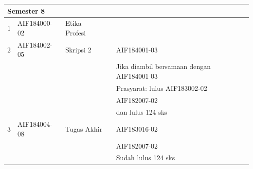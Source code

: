 \begin{table}[H]
\begin{tabular}{|p{0.5cm}|p{2.85cm}|p{4.95cm}|p{2.7cm}|p{2.7cm}|}
\multicolumn{5}{|l|}{\textbf{Semester 8}} \\ \hline
1 & AIF184000-02 & Etika Profesi &  &  \\ \hline
2 & AIF184002-05 & Skripsi 2 &  & AIF184001-03 \\ 
 &  &  &  & Jika diambil bersamaan dengan AIF184001-03 \\ 
 &  &  &  & Prasyarat: lulus AIF183002-02 \\ 
 &  &  &  & AIF182007-02 \\
 &  &  &  & dan lulus 124 sks \\ \hline
3 & AIF184004-08 & Tugas Akhir &  & AIF183016-02 \\ 
 &  &  &  & AIF182007-02 \\
 &  &  &  & Sudah lulus 124 sks \\ \hline
		\end{tabular}
	\label{tab:DaftarMataKuliahWajibDanPrasyaratnya2}
\end{table}

